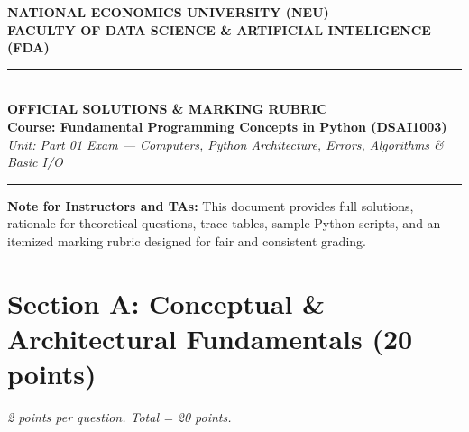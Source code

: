 \documentclass[11pt,a4paper]{article}
\begin{document}
\begin{center}
  {\Large\textbf{NATIONAL ECONOMICS UNIVERSITY (NEU)}}\\[0.15cm]
  {\large\textbf{FACULTY OF DATA SCIENCE \& ARTIFICIAL INTELIGENCE (FDA)}}\\[0.25cm]
  \rule{\textwidth}{1.2pt}\\[0.3cm]
  {\LARGE\bfseries\color{primaryblue}OFFICIAL SOLUTIONS \& MARKING RUBRIC}\\[0.15cm]
  {\large\textbf{Course: Fundamental Programming Concepts in Python (DSAI1003)}}\\[0.15cm]
  {\normalsize\textit{Unit: Part 01 Exam — Computers, Python Architecture, Errors, Algorithms \& Basic I/O}}\\[0.2cm]
  \rule{\textwidth}{0.6pt}
\end{center}

\vspace{0.2cm}

\begin{tcolorbox}[colback=green!8, colframe=correctgreen, arc=1.5mm]
\small
\textbf{Note for Instructors and TAs:}
This document provides full solutions, rationale for theoretical questions, trace tables, sample Python scripts, and an itemized marking rubric designed for fair and consistent grading.
\end{tcolorbox}

\vspace{0.2cm}

\section*{Section A: Conceptual \& Architectural Fundamentals (20 points)}
\textit{2 points per question. Total = 20 points.}
\end{document}
